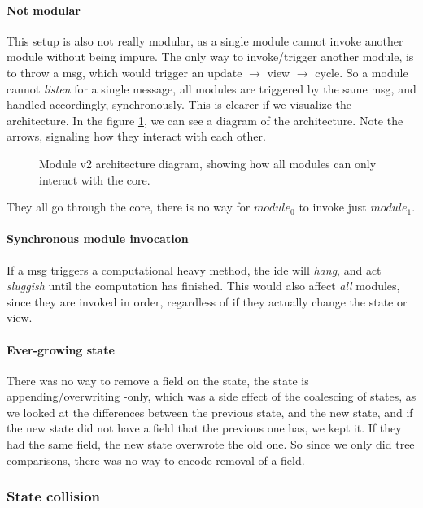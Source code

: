 \paragraph{Not modular} This setup is also not really modular, as a single
module cannot invoke another module without being impure. The only way to
invoke/trigger another module, is to throw a msg, which would trigger an update
$\to$ view $\to$ cycle. So a module cannot \textit{listen} for a single message,
all modules are triggered by the same msg, and handled accordingly,
synchronously. This is clearer if we visualize the architecture. In the figure
\ref{fig:modulev2}, we can see a diagram of the architecture. Note the arrows,
signaling how they interact with each other.

\begin{figure}[H]
  \centering
  
  \caption{
    Module v2 architecture diagram, showing how all modules can only interact
    with the core.
  }
  \label{fig:modulev2}
\end{figure}

They all go through the core, there is no way for $module_0$ to invoke just
$module_1$.

\paragraph{Synchronous module invocation} If a msg triggers a computational
heavy method, the \gls*{ide} will \textit{hang}, and act \textit{sluggish} until
the computation has finished. This would also affect \textit{all} modules,
since they are invoked in order, regardless of if they actually change the
state or view.

\paragraph{Ever-growing state} There was no way to remove a field on the state,
the state is appending/overwriting -only, which was a side effect of the
coalescing of states, as we looked at the differences between the previous
state, and the new state, and if the new state did not have a field that the
previous one has, we kept it. If they had the same field, the new state
overwrote the old one. So since we only did tree comparisons, there was no way
to encode removal of a field.

\subsubsection{State collision} \label{sec:collision}

